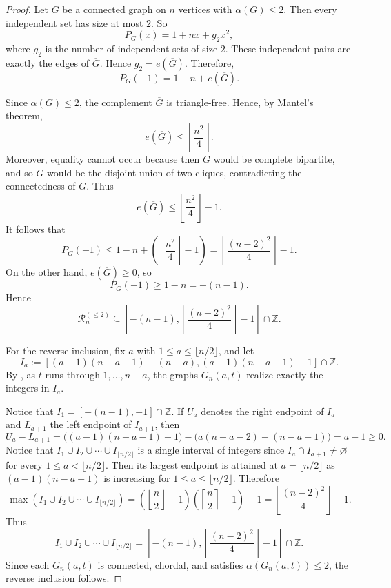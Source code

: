 \documentclass[12pt]{amsart}
\theoremstyle{plain}
\theoremstyle{definition}
\begin{document}
\begin{proof}
Let \(G\) be a connected graph on \(n\) vertices with \(\alpha(G)\leq 2\). Then
every independent set has size at most \(2\). So
\[
P_G(x)=1+nx+g_2x^2,
\]
where \(g_2\) is the number of independent sets of size \(2\). These independent
pairs are exactly the edges of \(\overline{G}\). Hence $g_2=e(\overline{G})$. Therefore,
\[
P_G(-1)=1-n+e(\overline{G}).
\]

Since \(\alpha(G)\leq 2\), the complement \(\overline{G}\) is triangle-free.
Hence, by Mantel's theorem,
\[
e(\overline{G})\leq \left\lfloor \frac{n^2}{4}\right\rfloor.
\]
Moreover, equality cannot occur because then \(\overline{G}\) would be complete
bipartite, and so \(G\) would be the disjoint union of two cliques, contradicting
the connectedness of \(G\). Thus
\[
e(\overline{G})\leq \left\lfloor \frac{n^2}{4}\right\rfloor-1.
\]
It follows that
\[
P_G(-1)\leq 1-n+\left(\left\lfloor \frac{n^2}{4}\right\rfloor-1\right)
=
\left\lfloor \frac{(n-2)^2}{4}\right\rfloor-1.
\]
On the other hand, \(e(\overline{G})\geq 0\), so
\[
P_G(-1)\geq 1-n=-(n-1).
\]
Hence
\[
\mathcal R_n^{(\leq 2)}
\subseteq
\left[
-(n-1),
\left\lfloor \frac{(n-2)^2}{4}\right\rfloor-1
\right]\cap \mathbb Z.
\]

For the reverse inclusion, fix \(a\) with \(1\leq a\leq \lfloor n/2\rfloor\), and let
\[
I_a:=
\left[
(a-1)(n-a-1)-(n-a), 
(a-1)(n-a-1)-1
\right]\cap \mathbb Z.
\]
By , as \(t\) runs through
\(1,\dots,n-a\), the graphs \(G_n(a,t)\) realize exactly the integers in \(I_a\).

Notice that  $I_1=[-(n-1),-1]\cap\mathbb Z$. If \(U_a\) denotes the right endpoint of \(I_a\) and \(L_{a+1}\) the left endpoint
of \(I_{a+1}\), then
\[
U_a-L_{a+1}
=
\bigl((a-1)(n-a-1)-1\bigr)
-
\bigl(a(n-a-2)-(n-a-1)\bigr)
=
a-1\geq 0.
\]
Notice that $I_1\cup I_2\cup \cdots \cup I_{\lfloor n/2\rfloor}$ is a single interval of integers since \(I_a\cap I_{a+1}\neq\varnothing\) for every
\(1\leq a<\lfloor n/2\rfloor\).  Then its largest endpoint is attained at \(a=\lfloor n/2\rfloor\) as $(a-1)(n-a-1)$ is increasing for \(1\leq a\leq \lfloor n/2\rfloor\). Therefore
\[
\max (I_1\cup I_2\cup \cdots \cup I_{\lfloor n/2\rfloor}) 
=
\left(\left\lfloor \frac n2\right\rfloor-1\right)
\left(\left\lceil \frac n2\right\rceil-1\right)-1
=
\left\lfloor \frac{(n-2)^2}{4}\right\rfloor-1.
\]
Thus
\[
I_1\cup I_2\cup \cdots \cup I_{\lfloor n/2\rfloor}
=
\left[
-(n-1),
\left\lfloor \frac{(n-2)^2}{4}\right\rfloor-1
\right]\cap \mathbb Z.
\]
Since each \(G_n(a,t)\) is connected, chordal, and satisfies \(\alpha(G_n(a,t))\leq 2\),
the reverse inclusion follows.
\end{proof}
\end{document}

